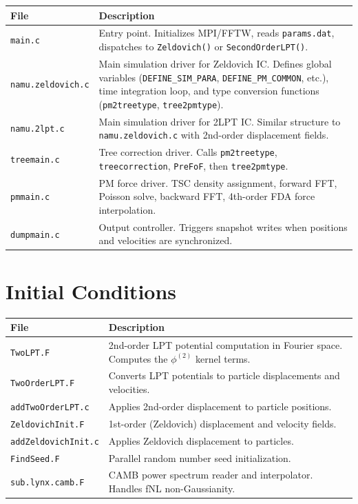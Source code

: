 \documentclass[11pt,fleqn]{book}
\newcommand{\code}[1]{\texttt{#1}}
\newcommand{\file}[1]{\texttt{#1}}
\begin{document}
\begin{longtable}{L{5cm} L{8.5cm}}
\toprule
\textbf{File} & \textbf{Description} \\
\midrule
\endhead
\file{main.c} & Entry point.  Initializes MPI/FFTW, reads \file{params.dat}, dispatches to \code{Zeldovich()} or \code{SecondOrderLPT()}. \\
\file{namu.zeldovich.c} & Main simulation driver for Zeldovich IC.  Defines global variables (\code{DEFINE\_SIM\_PARA}, \code{DEFINE\_PM\_COMMON}, etc.), time integration loop, and type conversion functions (\code{pm2treetype}, \code{tree2pmtype}). \\
\file{namu.2lpt.c} & Main simulation driver for 2LPT IC.  Similar structure to \file{namu.zeldovich.c} with 2nd-order displacement fields. \\
\file{treemain.c} & Tree correction driver.  Calls \code{pm2treetype}, \code{treecorrection}, \code{PreFoF}, then \code{tree2pmtype}. \\
\file{pmmain.c} & PM force driver.  TSC density assignment, forward FFT, Poisson solve, backward FFT, 4th-order FDA force interpolation. \\
\file{dumpmain.c} & Output controller.  Triggers snapshot writes when positions and velocities are synchronized. \\
\bottomrule
\end{longtable}

\section{Initial Conditions}

\begin{longtable}{L{5cm} L{8.5cm}}
\toprule
\textbf{File} & \textbf{Description} \\
\midrule
\endhead
\file{TwoLPT.F} & 2nd-order LPT potential computation in Fourier space.  Computes the $\phi^{(2)}$ kernel terms. \\
\file{TwoOrderLPT.F} & Converts LPT potentials to particle displacements and velocities. \\
\file{addTwoOrderLPT.c} & Applies 2nd-order displacement to particle positions. \\
\file{ZeldovichInit.F} & 1st-order (Zeldovich) displacement and velocity fields. \\
\file{addZeldovichInit.c} & Applies Zeldovich displacement to particles. \\
\file{FindSeed.F} & Parallel random number seed initialization. \\
\file{sub.lynx.camb.F} & CAMB power spectrum reader and interpolator.  Handles fNL non-Gaussianity. \\
\bottomrule
\end{longtable}
\end{document}
